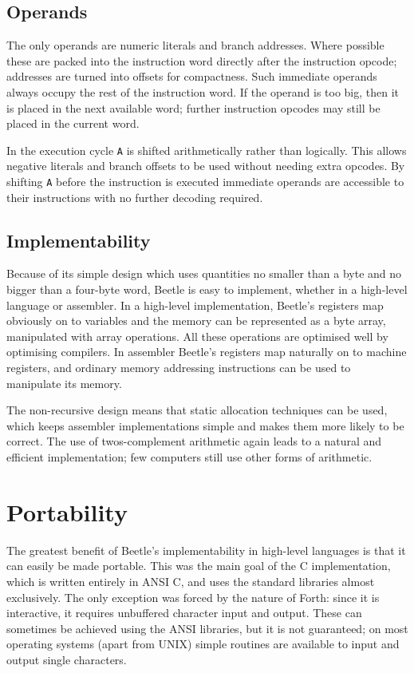 \documentclass{article}
\newcommand{\conc}[1]{\texttt{\textup{#1}}}
\begin{document}
\subsection{Operands}

The only operands are numeric literals and branch addresses. Where possible
these are packed into the instruction word directly after the instruction
opcode; addresses are turned into offsets for compactness. Such immediate
operands always occupy the rest of the instruction word. If the operand is
too big, then it is placed in the next available word; further instruction
opcodes may still be placed in the current word.

In the execution cycle \conc{A} is shifted arithmetically rather than
logically. This allows negative literals and branch offsets to be used
without needing extra opcodes. By shifting \conc{A} before the instruction is
executed immediate operands are accessible to their instructions with no
further decoding required.


\subsection{Implementability}

Because of its simple design which uses quantities no smaller than a byte
and no bigger than a four-byte word, Beetle is easy to implement, whether in
a high-level language or assembler. In a high-level implementation, Beetle's
registers map obviously on to variables and the memory can be represented as
a byte array, manipulated with array operations. All these operations are
optimised well by optimising compilers. In assembler Beetle's registers map
naturally on to machine registers, and ordinary memory addressing
instructions can be used to manipulate its memory.

The non-recursive design means that static allocation techniques can be used,
which keeps assembler implementations simple and makes them more likely to be
correct. The use of twos-complement arithmetic again leads to a natural and
efficient implementation; few computers still use other forms of arithmetic.



\section{Portability}

The greatest benefit of Beetle's implementability in high-level languages is
that it can easily be made portable. This was the main goal of the C
implementation, which is written entirely in ANSI C, and uses the standard
libraries almost exclusively. The only exception was forced by the nature of
Forth: since it is interactive, it requires unbuffered character input and
output. These can sometimes be achieved using the ANSI libraries, but it is
not guaranteed; on most operating systems (apart from UNIX) simple routines
are available to input and output single characters.
\end{document}
